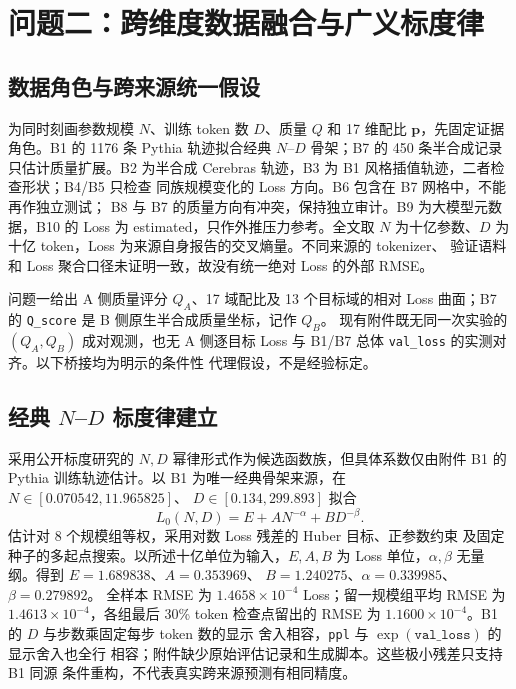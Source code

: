 \section{问题二：跨维度数据融合与广义标度律}

\subsection{数据角色与跨来源统一假设}

为同时刻画参数规模 $N$、训练 token 数 $D$、质量 $Q$ 和 17 维配比
$\boldsymbol p$，先固定证据角色。B1 的 1176 条 Pythia 轨迹拟合经典
$N$--$D$ 骨架；B7 的 450 条半合成记录只估计质量扩展。B2 为半合成
Cerebras 轨迹，B3 为 B1 风格插值轨迹，二者检查形状；B4/B5 只检查
同族规模变化的 Loss 方向。B6 包含在 B7 网格中，不能再作独立测试；
B8 与 B7 的质量方向有冲突，保持独立审计。B9 为大模型元数据，B10
的 Loss 为 estimated，只作外推压力参考。全文取 $N$ 为十亿参数、$D$
为十亿 token，Loss 为来源自身报告的交叉熵量。不同来源的 tokenizer、
验证语料和 Loss 聚合口径未证明一致，故没有统一绝对 Loss 的外部 RMSE。

问题一给出 A 侧质量评分 $Q_A$、17 域配比及 13 个目标域的相对 Loss
曲面；B7 的 \texttt{Q\_score} 是 B 侧原生半合成质量坐标，记作 $Q_B$。
现有附件既无同一次实验的 $(Q_A,Q_B)$ 成对观测，也无 A 侧逐目标 Loss
与 B1/B7 总体 \texttt{val\_loss} 的实测对齐。以下桥接均为明示的条件性
代理假设，不是经验标定。

\subsection{经典 $N$--$D$ 标度律建立}

采用公开标度研究的 $N,D$ 幂律形式作为候选函数族\cite{hoffmann2022}，但具体系数仅由附件 B1 的 Pythia 训练轨迹估计\cite{pythia2023}。以 B1 为唯一经典骨架来源，在 $N\in[0.070542,11.965825]$、
$D\in[0.134,299.893]$ 拟合
\begin{equation}\label{eq:cyj-b1}
L_0(N,D)=E+A N^{-\alpha}+B D^{-\beta}.
\end{equation}
估计对 8 个规模组等权，采用对数 Loss 残差的 Huber 目标、正参数约束
及固定种子的多起点搜索。以所述十亿单位为输入，$E,A,B$ 为 Loss
单位，$\alpha,\beta$ 无量纲。得到 $E=1.689838$、$A=0.353969$、
$B=1.240275$、$\alpha=0.339985$、$\beta=0.279892$。
全样本 RMSE 为 $1.4658\times10^{-4}$ Loss；留一规模组平均 RMSE 为
$1.4613\times10^{-4}$，各组最后 30\% token 检查点留出的 RMSE 为
$1.1600\times10^{-4}$。B1 的 $D$ 与步数乘固定每步 token 数的显示
舍入相容，\texttt{ppl} 与 $\exp(\texttt{val\_loss})$ 的显示舍入也全行
相容；附件缺少原始评估记录和生成脚本。这些极小残差只支持 B1 同源
条件重构，不代表真实跨来源预测有相同精度。

